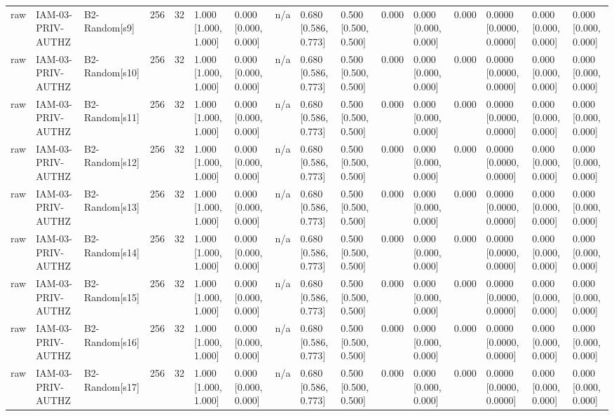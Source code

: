 \begin{table}[!ht]
{\begin{tabular}{llllllllllllllll}
raw & IAM-03-PRIV-AUTHZ & B2-Random[s9] & 256 & 32 & 1.000 [1.000, 1.000] & 0.000 [0.000, 0.000] & n/a & 0.680 [0.586, 0.773] & 0.500 [0.500, 0.500] & 0.000 & 0.000 [0.000, 0.000] & 0.000 & 0.0000 [0.0000, 0.0000] & 0.000 [0.000, 0.000] & 0.000 [0.000, 0.000] \\
raw & IAM-03-PRIV-AUTHZ & B2-Random[s10] & 256 & 32 & 1.000 [1.000, 1.000] & 0.000 [0.000, 0.000] & n/a & 0.680 [0.586, 0.773] & 0.500 [0.500, 0.500] & 0.000 & 0.000 [0.000, 0.000] & 0.000 & 0.0000 [0.0000, 0.0000] & 0.000 [0.000, 0.000] & 0.000 [0.000, 0.000] \\
raw & IAM-03-PRIV-AUTHZ & B2-Random[s11] & 256 & 32 & 1.000 [1.000, 1.000] & 0.000 [0.000, 0.000] & n/a & 0.680 [0.586, 0.773] & 0.500 [0.500, 0.500] & 0.000 & 0.000 [0.000, 0.000] & 0.000 & 0.0000 [0.0000, 0.0000] & 0.000 [0.000, 0.000] & 0.000 [0.000, 0.000] \\
raw & IAM-03-PRIV-AUTHZ & B2-Random[s12] & 256 & 32 & 1.000 [1.000, 1.000] & 0.000 [0.000, 0.000] & n/a & 0.680 [0.586, 0.773] & 0.500 [0.500, 0.500] & 0.000 & 0.000 [0.000, 0.000] & 0.000 & 0.0000 [0.0000, 0.0000] & 0.000 [0.000, 0.000] & 0.000 [0.000, 0.000] \\
raw & IAM-03-PRIV-AUTHZ & B2-Random[s13] & 256 & 32 & 1.000 [1.000, 1.000] & 0.000 [0.000, 0.000] & n/a & 0.680 [0.586, 0.773] & 0.500 [0.500, 0.500] & 0.000 & 0.000 [0.000, 0.000] & 0.000 & 0.0000 [0.0000, 0.0000] & 0.000 [0.000, 0.000] & 0.000 [0.000, 0.000] \\
raw & IAM-03-PRIV-AUTHZ & B2-Random[s14] & 256 & 32 & 1.000 [1.000, 1.000] & 0.000 [0.000, 0.000] & n/a & 0.680 [0.586, 0.773] & 0.500 [0.500, 0.500] & 0.000 & 0.000 [0.000, 0.000] & 0.000 & 0.0000 [0.0000, 0.0000] & 0.000 [0.000, 0.000] & 0.000 [0.000, 0.000] \\
raw & IAM-03-PRIV-AUTHZ & B2-Random[s15] & 256 & 32 & 1.000 [1.000, 1.000] & 0.000 [0.000, 0.000] & n/a & 0.680 [0.586, 0.773] & 0.500 [0.500, 0.500] & 0.000 & 0.000 [0.000, 0.000] & 0.000 & 0.0000 [0.0000, 0.0000] & 0.000 [0.000, 0.000] & 0.000 [0.000, 0.000] \\
raw & IAM-03-PRIV-AUTHZ & B2-Random[s16] & 256 & 32 & 1.000 [1.000, 1.000] & 0.000 [0.000, 0.000] & n/a & 0.680 [0.586, 0.773] & 0.500 [0.500, 0.500] & 0.000 & 0.000 [0.000, 0.000] & 0.000 & 0.0000 [0.0000, 0.0000] & 0.000 [0.000, 0.000] & 0.000 [0.000, 0.000] \\
raw & IAM-03-PRIV-AUTHZ & B2-Random[s17] & 256 & 32 & 1.000 [1.000, 1.000] & 0.000 [0.000, 0.000] & n/a & 0.680 [0.586, 0.773] & 0.500 [0.500, 0.500] & 0.000 & 0.000 [0.000, 0.000] & 0.000 & 0.0000 [0.0000, 0.0000] & 0.000 [0.000, 0.000] & 0.000 [0.000, 0.000] \\

\end{tabular}}
\end{table}
